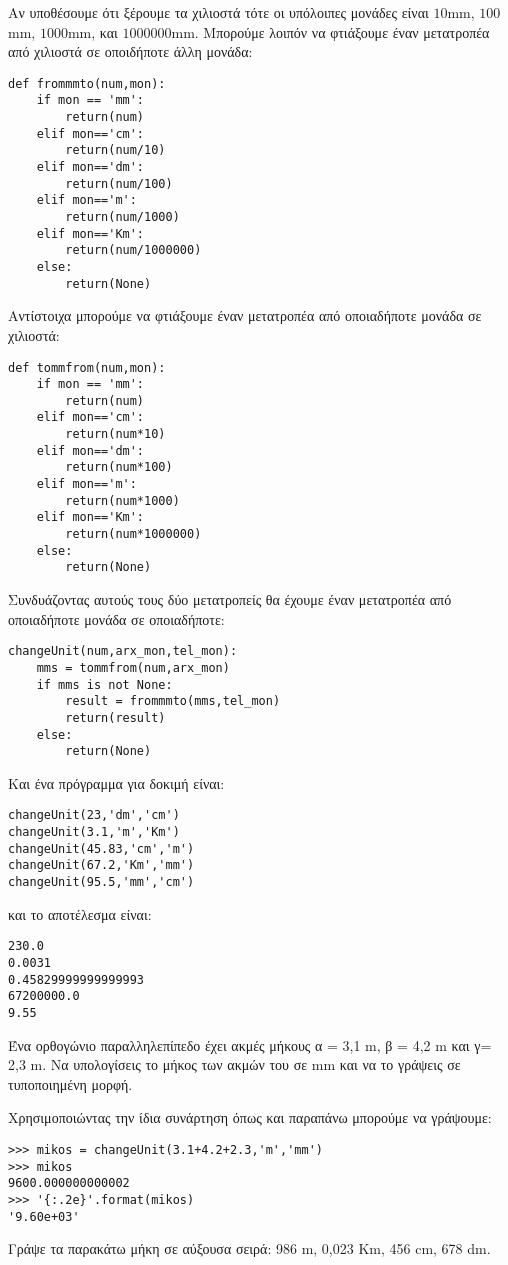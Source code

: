 Αν υποθέσουμε ότι ξέρουμε τα χιλιοστά τότε οι υπόλοιπες μονάδες είναι $10$mm, $100$mm, $1000$mm, και $1000000$mm.
Μπορούμε λοιπόν να φτιάξουμε έναν μετατροπέα από χιλιοστά σε οποιδήποτε άλλη μονάδα:
\begin{lstlisting}
def frommmto(num,mon):
    if mon == 'mm':
        return(num)
    elif mon=='cm':
        return(num/10)
    elif mon=='dm':
        return(num/100)
    elif mon=='m':
        return(num/1000)
    elif mon=='Km':
        return(num/1000000)
    else:
        return(None)
\end{lstlisting}
Αντίστοιχα μπορούμε να φτιάξουμε έναν μετατροπέα από οποιαδήποτε μονάδα σε χιλιοστά:
\begin{lstlisting}
def tommfrom(num,mon):
    if mon == 'mm':
        return(num)
    elif mon=='cm':
        return(num*10)
    elif mon=='dm':
        return(num*100)
    elif mon=='m':
        return(num*1000)
    elif mon=='Km':
        return(num*1000000)
    else:
        return(None)
\end{lstlisting}
Συνδυάζοντας αυτούς τους δύο μετατροπείς θα έχουμε έναν μετατροπέα από οποιαδήποτε μονάδα σε οποιαδήποτε:
\begin{lstlisting}
changeUnit(num,arx_mon,tel_mon):
    mms = tommfrom(num,arx_mon)
    if mms is not None:
        result = frommmto(mms,tel_mon)
        return(result)
    else:
        return(None)
\end{lstlisting}
Και ένα πρόγραμμα για δοκιμή είναι:
\begin{lstlisting}
changeUnit(23,'dm','cm')
changeUnit(3.1,'m','Km')
changeUnit(45.83,'cm','m')
changeUnit(67.2,'Km','mm')
changeUnit(95.5,'mm','cm')
\end{lstlisting}
και το αποτέλεσμα είναι:
\begin{lstlisting}
230.0
0.0031
0.45829999999999993
67200000.0
9.55
\end{lstlisting}
\begin{exercise}
Ένα ορθογώνιο παραλληλεπίπεδο έχει ακμές μήκους α = 3,1 m, β = 4,2 m και γ= 2,3 m. Να υπολογίσεις το μήκος των ακμών του σε mm και να το γράψεις σε τυποποιημένη μορφή.
\end{exercise}
Χρησιμοποιώντας την ίδια συνάρτηση όπως και παραπάνω μπορούμε να γράψουμε:
\begin{lstlisting}
>>> mikos = changeUnit(3.1+4.2+2.3,'m','mm')
>>> mikos
9600.000000000002
>>> '{:.2e}'.format(mikos)
'9.60e+03'
\end{lstlisting}
\begin{exercise}
Γράψε τα παρακάτω μήκη σε αύξουσα σειρά: 986 m, 0,023 Κm, 456 cm, 678 dm.
\end{exercise}
